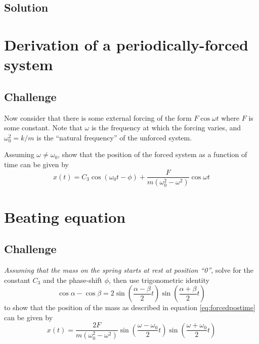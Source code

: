 \subsection*{Solution}




\newpage
\section{Derivation of a periodically-forced system}

\subsection*{Challenge}
Now consider that there is some external forcing of the form $F \cos \omega t$ where $F$ is some constant.
Note that $\omega$ is the frequency at which the forcing varies, and $\omega_0^2 = k/m$ is the ``natural frequency'' of the unforced system.

Assuming $\omega \ne \omega_0$, show that the position of the forced system as a function of time can be given by
\begin{equation}
    \label{eq:forcedpostime}
    x(t) = C_3 \cos(\omega_0 t - \phi) + \frac{F}{m(\omega_0^2 - \omega^2)} \cos \omega t
\end{equation}




\newpage
\section{Beating equation}

\subsection*{Challenge}
\emph{Assuming that the mass on the spring starts at rest at position ``0''}, solve for the constant $C_3$ and the phase-shift $\phi$, then use trigonometric identity
\begin{equation}
    \cos \alpha - \cos \beta = 2 \sin \left( \frac{\alpha - \beta}{2} t \right) \sin \left( \frac{\alpha + \beta}{2} t \right)
\end{equation}
to show that the position of the mass as described in equation \ref{eq:forcedpostime} can be given by
\begin{equation}
    x(t) = \frac{2 F}{m(\omega_0^2 - \omega^2)} \sin \left( \frac{\omega - \omega_0}{2} t \right) \sin \left( \frac{\omega + \omega_0}{2} t \right)
\end{equation}





